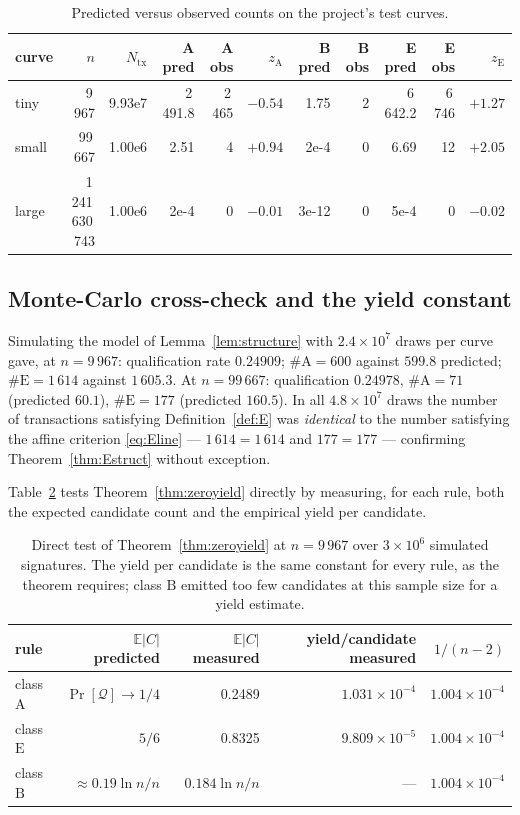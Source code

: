\documentclass[11pt,a4paper]{article}
\theoremstyle{plain}
\theoremstyle{definition}
\theoremstyle{remark}
\newcommand{\Qu}{\mathcal{Q}}
\newcommand{\Ex}{\mathbb{E}}
\newcommand{\Pro}{\Pr}
\newcommand{\clA}{\mathrm{A}}
\newcommand{\clB}{\mathrm{B}}
\newcommand{\clE}{\mathrm{E}}
\begin{document}
\begin{table}[t]
\centering\small
\begin{tabular}{lrrrrrrrrrr}
\toprule
curve & $n$ & $N_{\mathrm{tx}}$ & A pred & A obs & $z_{\clA}$ & B pred & B obs & E pred & E obs & $z_{\clE}$\\
\midrule
tiny  & 9\,967 & 9.93e7 & 2\,491.8 & 2\,465 & $-0.54$ & 1.75 & 2 & 6\,642.2 & 6\,746 & $+1.27$\\
small & 99\,667 & 1.00e6 & 2.51 & 4 & $+0.94$ & 2e{-}4 & 0 & 6.69 & 12 & $+2.05$\\
large & 1\,241\,630\,743 & 1.00e6 & 2e{-}4 & 0 & $-0.01$ & 3e{-}12 & 0 & 5e{-}4 & 0 & $-0.02$\\
\bottomrule
\end{tabular}
\caption{Predicted versus observed counts on the project's test curves.}
\label{tab:curves}
\end{table}

\subsection{Monte-Carlo cross-check and the yield constant}

Simulating the model of Lemma~\ref{lem:structure} with $2.4\times10^{7}$ draws per curve gave, at
$n = 9\,967$: qualification rate $0.24909$; $\#\clA = 600$ against $599.8$ predicted;
$\#\clE = 1\,614$ against $1\,605.3$. At $n = 99\,667$: qualification $0.24978$, $\#\clA = 71$
(predicted $60.1$), $\#\clE = 177$ (predicted $160.5$). In all $4.8\times10^{7}$ draws the number
of transactions satisfying Definition~\ref{def:E} was \emph{identical} to the number satisfying
the affine criterion \eqref{eq:Eline} --- $1\,614 = 1\,614$ and $177 = 177$ --- confirming
Theorem~\ref{thm:Estruct} without exception.

Table~\ref{tab:yield} tests Theorem~\ref{thm:zeroyield} directly by measuring, for each rule, both
the expected candidate count and the empirical yield per candidate.

\begin{table}[t]
\centering\small
\begin{tabular}{lrrrr}
\toprule
rule & $\Ex|C|$ predicted & $\Ex|C|$ measured & yield/candidate measured & $1/(n-2)$\\
\midrule
class $\clA$ & $\Pro[\Qu] \to 1/4$ & 0.2489 & $1.031\times10^{-4}$ & $1.004\times10^{-4}$\\
class $\clE$ & $5/6$ & 0.8325 & $9.809\times10^{-5}$ & $1.004\times10^{-4}$\\
class $\clB$ & $\approx 0.19\ln n/n$ & $0.184\ln n/n$ & --- & $1.004\times10^{-4}$\\
\bottomrule
\end{tabular}
\caption{Direct test of Theorem~\ref{thm:zeroyield} at $n = 9\,967$ over $3\times10^{6}$
simulated signatures. The yield per candidate is the same constant for every rule, as the theorem
requires; class $\clB$ emitted too few candidates at this sample size for a yield estimate.}
\label{tab:yield}
\end{table}
\end{document}
